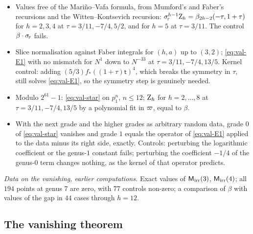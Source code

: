 \begin{itemize}
\item Values free of the Mari\~no--Vafa formula, from Mumford's and Faber's recursions and the Witten--Kontsevich recursion: $\sigma_{\!\tau}^{h-1}\mathrm{Z}_h=\beta_{2h-2}(-\tau,1+\tau)$ for $h=2,3,4$ at $\tau=3/11,-7/4,5/2$, and for $h=5$ at $\tau=3/11$. The control $\beta\cdot\sigma_{\!\tau}$ fails.
\item Slice normalisation against Faber integrals for $(h,a)$ up to $(3,2)$; \cref{eq:val-E1} with no mismatch for $N^1$ down to $N^{-33}$ at $\tau=3/11,-7/4,13/5$. Kernel control: adding $(5/3)f_*((1+\tau)\mathsf{t})^4$, which breaks the symmetry in $\tau$, still solves \cref{eq:val-E1}, so the symmetry step is genuinely needed.
\item Modulo $2^{61}-1$: \cref{eq:val-star} on $p_1^n$, $n\leq 12$; $\mathrm{Z}_h$ for $h=2,\dots,8$ at $\tau=3/11,-7/4,13/5$ by a polynomial fit in $\varpi$, equal to $\beta$.
\item With the next grade and the higher grades as arbitrary random data, grade $0$ of \cref{eq:val-star} vanishes and grade $1$ equals the operator of \cref{eq:val-E1} applied to the data minus its right side, exactly. Controls: perturbing the logarithmic coefficient or the genus-$1$ constant fails; perturbing the coefficient $-1/4$ of the genus-$0$ term changes nothing, as the kernel of that operator predicts.
\end{itemize}


\emph{Data on the vanishing, earlier computations.} Exact values of $\mathsf{M}_{\mathrm{irr}}(3)$, $\mathsf{M}_{\mathrm{irr}}(4)$; all $194$ points at genus $7$ are zero, with $77$ controls non-zero; a comparison of $\beta$ with values of the gap in $44$ cases through $h=12$.

\subsection{The vanishing theorem}
\label{sec:evi-van}

